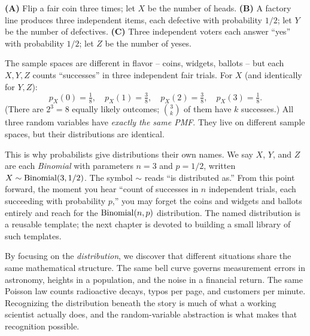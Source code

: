 \begin{example}
\label{ch06:ex-same-dist}
\textbf{(A)} Flip a fair coin three times; let $X$ be the number of heads.
\textbf{(B)} A factory line produces three independent items, each defective with
probability $1/2$; let $Y$ be the number of defectives.
\textbf{(C)} Three independent voters each answer ``yes'' with probability $1/2$; let
$Z$ be the number of yeses.

The sample spaces are different in flavor -- coins, widgets, ballots -- but each
$X,Y,Z$ counts ``successes'' in three independent fair trials. For $X$ (and identically
for $Y,Z$):
\[
  p_X(0) = \tfrac{1}{8},\quad p_X(1) = \tfrac{3}{8},\quad
  p_X(2) = \tfrac{3}{8},\quad p_X(3) = \tfrac{1}{8}.
\]
(There are $2^3 = 8$ equally likely outcomes; $\binom{3}{k}$ of them have $k$
successes.) All three random variables have \emph{exactly the same PMF}. They live on
different sample spaces, but their distributions are identical.
\end{example}

This is why probabilists give distributions their own names. We say $X$, $Y$, and $Z$
are each \emph{Binomial} with parameters $n = 3$ and $p = 1/2$, written
$X \sim \operatorname{Binomial}(3, 1/2)$. The symbol $\sim$ reads ``is distributed as.'' From this point
forward, the moment you hear ``count of successes in $n$ independent trials, each
succeeding with probability $p$,'' you may forget the coins and widgets and ballots
entirely and reach for the $\operatorname{Binomial}(n,p)$ distribution. The named distribution is a reusable
template; the next chapter is devoted to building a small library of such templates.

\begin{aestheticbox}
By focusing on the \emph{distribution}, we discover that different situations share the same mathematical structure. The
same bell curve governs measurement errors in astronomy, heights in a population, and
the noise in a financial return. The same Poisson law counts radioactive decays,
typos per page, and customers per minute. Recognizing the distribution beneath the
story is much of what a working scientist actually does, and the random-variable
abstraction is what makes that recognition possible.
\end{aestheticbox}

